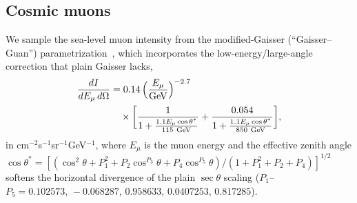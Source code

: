 \subsection{Cosmic muons}

We sample the sea-level muon intensity from the modified-Gaisser
(``Gaisser--Guan'') parametrization~\cite{gaisser,guan2015}, which
incorporates the low-energy/large-angle correction that plain Gaisser
lacks,
\begin{equation}
\begin{aligned}
\frac{dI}{dE_\mu\,d\Omega}
&= 0.14\,\Big(\frac{E_\mu}{\rm GeV}\Big)^{-2.7}\\
&\quad\times\bigg[\frac{1}{1+\tfrac{1.1 E_\mu\cos\theta^\ast}{115~{\rm GeV}}}
+\frac{0.054}{1+\tfrac{1.1 E_\mu\cos\theta^\ast}{850~{\rm GeV}}}\bigg],
\end{aligned}
\label{eq:gaisser}
\end{equation}
in cm$^{-2}$s$^{-1}$sr$^{-1}$GeV$^{-1}$, where $E_\mu$ is the muon
energy and the effective zenith angle
$\cos\theta^\ast=[(\cos^2\theta+P_1^2+P_2\cos^{P_3}\theta+P_4\cos^{P_5}\theta)/(1+P_1^2+P_2+P_4)]^{1/2}$
softens the horizontal divergence of the plain $\sec\theta$ scaling
($P_1$--$P_5=0.102573,\,-0.068287,\,0.958633,\,0.0407253,\,0.817285$).

